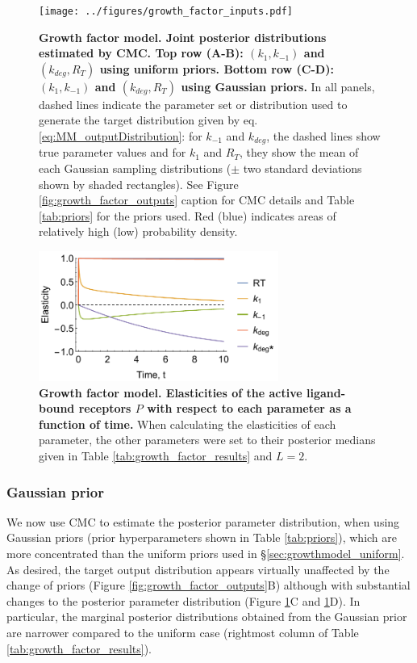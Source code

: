 \begin{figure}[H]
	\centerline{\texttt{[image: ../figures/growth\_factor\_inputs.pdf]}}
	\caption{\textbf{Growth factor model. Joint posterior distributions estimated by CMC. Top row (A-B): $(k_1,k_{-1})$ and $(k_{deg},R_T)$ using uniform priors. Bottom row (C-D): $(k_1,k_{-1})$ and $(k_{deg},R_T)$ using Gaussian priors.} In all panels, dashed lines indicate the parameter set or distribution used to generate the target distribution given by eq. \eqref{eq:MM_outputDistribution}: for $k_{-1}$ and $k_{deg}$, the dashed lines show true parameter values and for $k_1$ and $R_T$, they show the mean of each Gaussian sampling distributions ($\pm$ two standard deviations shown by shaded rectangles). See Figure \ref{fig:growth_factor_outputs} caption for CMC details and Table \ref{tab:priors} for the priors used. Red (blue) indicates areas of relatively high (low) probability density.}
	\label{fig:growth_factor_inputs}
\end{figure}

\begin{figure}[H]
	\centerline{\includegraphics[width=0.7\textwidth]{../figures/dixit_elasticities.pdf}}
	\caption{\textbf{Growth factor model. Elasticities of the active ligand-bound receptors $P$ with respect to each parameter as a function of time.} When calculating the elasticities of each parameter, the other parameters were set to their posterior medians given in Table \ref{tab:growth_factor_results} and $L=2$.}
	\label{fig:dixit_elasticities}
\end{figure}

\subsubsection{Gaussian prior}\label{sec:growthmodel_gaussian}
We now use CMC to estimate the posterior parameter distribution, when using Gaussian priors (prior hyperparameters shown in Table \ref{tab:priors}), which are more concentrated than the uniform priors used in \S\ref{sec:growthmodel_uniform}. As desired, the target output distribution appears virtually unaffected by the change of priors (Figure \ref{fig:growth_factor_outputs}B) although with substantial changes to the posterior parameter distribution (Figure \ref{fig:growth_factor_inputs}C and \ref{fig:growth_factor_inputs}D). In particular, the marginal posterior distributions obtained from the Gaussian prior are narrower compared to the uniform case (rightmost column of Table \ref{tab:growth_factor_results}).

